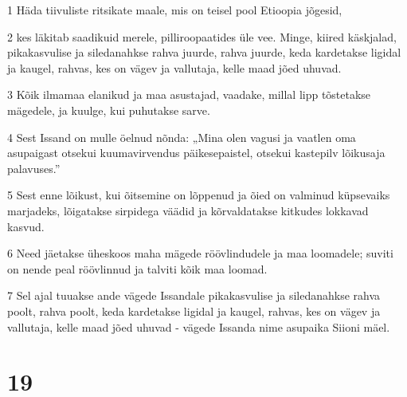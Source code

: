 \par 1 Häda tiivuliste ritsikate maale, mis on teisel pool Etioopia jõgesid,
\par 2 kes läkitab saadikuid merele, pilliroopaatides üle vee. Minge, kiired käskjalad, pikakasvulise ja siledanahkse rahva juurde, rahva juurde, keda kardetakse ligidal ja kaugel, rahvas, kes on vägev ja vallutaja, kelle maad jõed uhuvad.
\par 3 Kõik ilmamaa elanikud ja maa asustajad, vaadake, millal lipp tõstetakse mägedele, ja kuulge, kui puhutakse sarve.
\par 4 Sest Issand on mulle öelnud nõnda: „Mina olen vagusi ja vaatlen oma asupaigast otsekui kuumavirvendus päikesepaistel, otsekui kastepilv lõikusaja palavuses.”
\par 5 Sest enne lõikust, kui õitsemine on lõppenud ja õied on valminud küpsevaiks marjadeks, lõigatakse sirpidega väädid ja kõrvaldatakse kitkudes lokkavad kasvud.
\par 6 Need jäetakse üheskoos maha mägede röövlindudele ja maa loomadele; suviti on nende peal röövlinnud ja talviti kõik maa loomad.
\par 7 Sel ajal tuuakse ande vägede Issandale pikakasvulise ja siledanahkse rahva poolt, rahva poolt, keda kardetakse ligidal ja kaugel, rahvas, kes on vägev ja vallutaja, kelle maad jõed uhuvad - vägede Issanda nime asupaika Siioni mäel.

\chapter{19}

